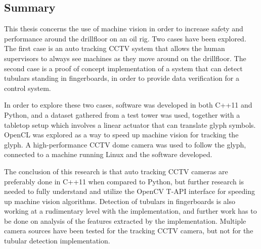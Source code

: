\subsection*{Summary}
This thesis concerns the use of machine vision in order to increase safety and performance around the drillfloor on an oil rig.
Two cases have been explored. The first case is  an auto tracking CCTV system that allows the human supervisors to always see machines as they move around on the drillfloor. The second case is a proof of concept implementation of a system that can detect tubulars standing in fingerboards, in order to provide data verification for a control system.

In order to explore these two cases, software was developed in both C++11 and Python, and a dataset gathered from a test tower was used, together with a tabletop setup which involves a linear actuator that can translate glyph symbols. OpenCL was explored as a way to speed up machine vision for tracking the glyph. A high-performance CCTV dome camera was used to follow the glyph, connected to a machine running Linux and the software developed.

The conclusion of this research is that auto tracking CCTV cameras are preferably done in C++11 when compared to Python, but further research is needed to fully understand and utilize the OpenCV T-API interface for speeding up machine vision algorithms. Detection of tubulars in fingerboards is also working at a rudimentary level with the implementation, and further work has to be done on analysis of the features extracted by the implementation. Multiple camera sources have been tested for the tracking CCTV camera, but not for the tubular detection implementation.
\newpage